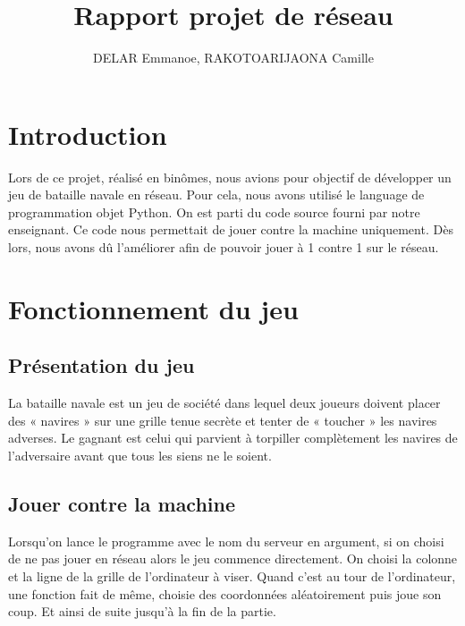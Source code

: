 \documentclass{article}
\title{Rapport projet de r\'eseau}
\author{DELAR Emmanoe, RAKOTOARIJAONA Camille}
\begin{document}
\maketitle
\newpage
\tableofcontents

\newpage
\section{Introduction}
Lors de ce projet, r\'ealis\'e en bin\^omes, nous avions pour objectif de d\'evelopper un jeu de bataille navale en r\'eseau. Pour cela, nous avons utilis\'e le language de programmation objet Python.
On est parti du code source fourni par notre enseignant. Ce code nous permettait de jouer contre la machine uniquement. D\`es lors, nous avons d\^u l'am\'eliorer afin de pouvoir jouer \`a 1 contre 1 sur le r\'eseau.  

\section{Fonctionnement du jeu}
	 \subsection{Pr\'esentation du jeu}
	 La bataille navale est un jeu de soci\'et\'e dans lequel deux joueurs doivent placer des « navires » sur une grille tenue secrète et tenter de « toucher » les navires adverses. Le gagnant est celui qui parvient \`a torpiller compl\`etement les navires de l'adversaire avant que tous les siens ne le soient.

	 \subsection{Jouer contre la machine}
	 Lorsqu'on lance le programme avec le nom du serveur en argument, si on choisi de ne pas jouer en r\'eseau alors le jeu commence directement. On choisi la colonne et la ligne de la grille de l'ordinateur \`a viser. Quand c'est au tour de l'ordinateur, une fonction fait de m\^eme, choisie des coordonn\'ees al\'eatoirement puis joue son coup. Et ainsi de suite jusqu'\`a la fin de la partie. 
\end{document}
